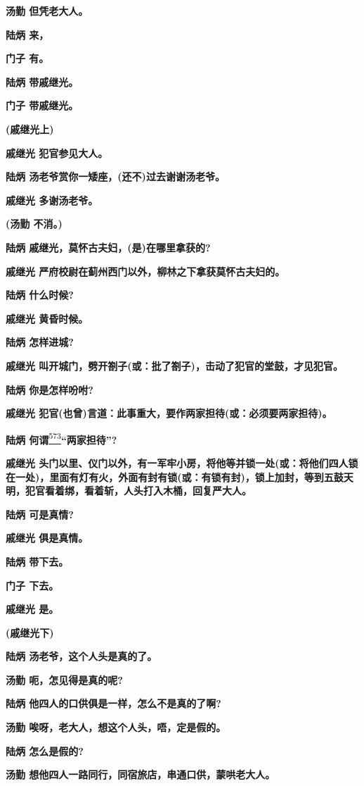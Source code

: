 \textbf{汤勤 但凭老大人。}

\textbf{陆炳 来，}

\textbf{门子 有。}

\textbf{陆炳 带戚继光。}

\textbf{门子 带戚继光。}

\textbf{(戚继光上)}

\textbf{戚继光 犯官参见大人。}

\textbf{陆炳 汤老爷赏你一矮座，(还不)过去谢谢汤老爷。}

\textbf{戚继光 多谢汤老爷。}

\textbf{(汤勤 不消。)}

\textbf{陆炳 戚继光，莫怀古夫妇，(是)在哪里拿获的?}

\textbf{戚继光 严府校尉在蓟州西门以外，柳林之下拿获莫怀古夫妇的。}

\textbf{陆炳 什么时候?}

\textbf{戚继光 黄昏时候。}

\textbf{陆炳 怎样进城?}

\textbf{戚继光
叫开城门，劈开劄子(或：批了劄子)，击动了犯官的堂鼓，才见犯官。}

\textbf{陆炳 你是怎样吩咐?}

\textbf{戚继光
犯官(也曾)言道：此事重大，要作两家担待(或：必须要两家担待)。}

\textbf{陆炳
何谓}\protect\hyperlink{fn573}{\textsuperscript{573}}\textbf{``两家担待''?}

\textbf{戚继光
头门以里、仪门以外，有一军牢小房，将他等并锁一处(或：将他们四人锁在一处)，里面有灯有火，外面有封有锁(或：有锁有封)，锁上加封，等到五鼓天明，犯官看着绑，看着斩，人头打入木桶，回复严大人。}

\textbf{陆炳 可是真情?}

\textbf{戚继光 俱是真情。}

\textbf{陆炳 带下去。}

\textbf{门子 下去。}

\textbf{戚继光 是。}

\textbf{(戚继光下)}

\textbf{陆炳 汤老爷，这个人头是真的了。}

\textbf{汤勤 呃，怎见得是真的呢?}

\textbf{陆炳 他四人的口供俱是一样，怎么不是真的了啊?}

\textbf{汤勤 唉呀，老大人，想这个人头，唔，定是假的。}

\textbf{陆炳 怎么是假的?}

\textbf{汤勤 想他四人一路同行，同宿旅店，串通口供，蒙哄老大人。}

